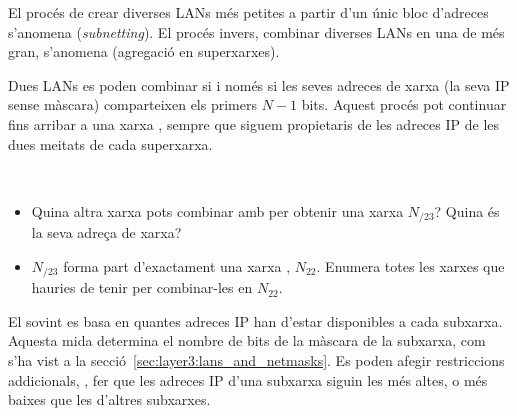 El procés de crear diverses LANs més petites a partir d'un únic bloc d'adreces s'anomena  (\textit{subnetting}).
El procés invers, combinar diverses LANs en una de més gran, s'anomena  (agregació en superxarxes).

Dues LANs  es poden combinar si i només si les seves adreces de xarxa 
(la seva IP sense màscara) comparteixen els primers $N-1$ bits. Aquest procés pot continuar fins arribar 
a una xarxa , sempre que siguem propietaris de les adreces IP de les dues meitats de cada superxarxa.

\begin{exercise}\ \\[-0.5cm]
\begin{itemize}
\item Quina altra xarxa pots combinar amb 
per obtenir una xarxa  $N_{/23}$? Quina és la seva adreça de xarxa?

\item $N_{/23}$ forma part d'exactament una xarxa , $N_{22}$. 
  Enumera totes les xarxes  que hauries de tenir per combinar-les en $N_{22}$.
\end{itemize}
\end{exercise}

El  sovint es basa en quantes adreces IP han d'estar
disponibles a cada subxarxa. 
Aquesta mida determina el nombre de bits de la màscara de la subxarxa, com s'ha vist a la secció~\ref{sec:layer3:lans_and_netmasks}.
Es poden afegir restriccions addicionals, \eg, fer que les adreces IP d'una subxarxa siguin les més altes,
o més baixes que les d'altres subxarxes. 

